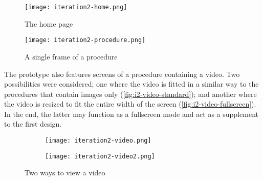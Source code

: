 \begin{sidewaysfigure}
    \centering
    \hspace{\fill}
    \begin{minipage}{0.4\textwidth}
        \centering
        \texttt{[image: iteration2-home.png]}
        \caption{The home page}
        \label{fig:i2-home}
    \end{minipage}
    \hspace{\fill}
    \begin{minipage}{0.4\textwidth}
        \centering
        \texttt{[image: iteration2-procedure.png]}
        \caption{A single frame of a procedure}
        \label{fig:i2-procedure}
    \end{minipage}
    \hspace*{\fill}
\end{sidewaysfigure}

The prototype also features screens of a procedure containing a video. Two possibilities were considered; one where the video is fitted in a similar way to the procedures that contain images only (\autoref{fig:i2-video-standard}); and another where the video is resized to fit the entire width of the screen (\autoref{fig:i2-video-fullscreen}). In the end, the latter may function as a fullscreen mode and act as a supplement to the first design.

\begin{sidewaysfigure}
    \centering
    \hspace{\fill}
    \begin{subfigure}{0.4\textwidth}
        \centering
        \texttt{[image: iteration2-video.png]}
        \label{fig:i2-video-standard}
    \end{subfigure}
    \hspace{\fill}
    \begin{subfigure}{0.4\textwidth}
        \centering
        \texttt{[image: iteration2-video2.png]}
        \label{fig:i2-video-fullscreen}
    \end{subfigure}
    \hspace*{\fill}
    \caption{Two ways to view a video}
    \label{fig:i2-video}
\end{sidewaysfigure}

